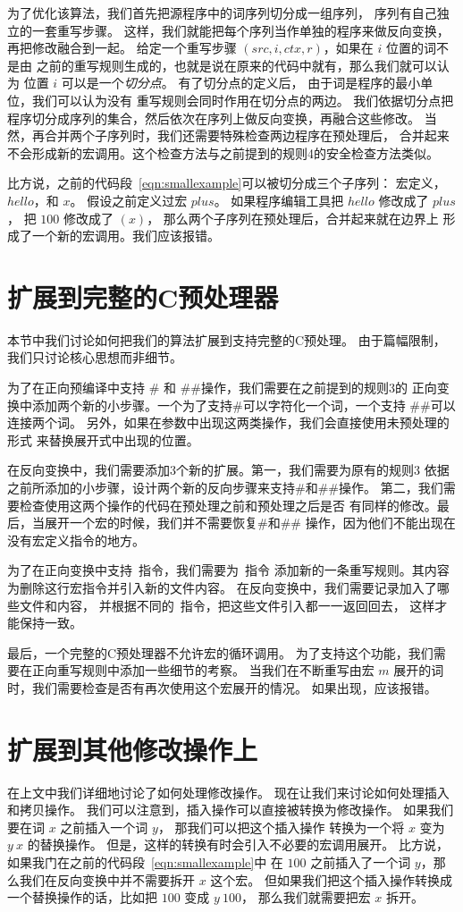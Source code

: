 为了优化该算法，我们首先把源程序中的词序列切分成一组序列，
序列有自己独立的一套重写步骤。
这样，我们就能把每个序列当作单独的程序来做反向变换，再把修改融合到一起。
给定一个重写步骤 $(src, i, ctx, r)$，如果在 $i$ 位置的词不是由
之前的重写规则生成的，也就是说在原来的代码中就有，那么我们就可以认为
位置 $i$ 可以是一个\emph{切分点}。
有了切分点的定义后， 由于词是程序的最小单位，我们可以认为没有
重写规则会同时作用在切分点的两边。
我们依据切分点把程序切分成序列的集合，然后依次在序列上做反向变换，再融合这些修改。
当然，再合并两个子序列时，我们还需要特殊检查两边程序在预处理后，
合并起来不会形成新的宏调用。这个检查方法与之前提到的规则4的安全检查方法类似。

比方说，之前的代码段~\ref{eqn:smallexample}可以被切分成三个子序列：
宏定义， $hello$，和 $x$。
假设之前定义过宏 $plus$。 如果程序编辑工具把 $hello$ 修改成了 $plus$，
把 $100$ 修改成了 $(x)$， 那么两个子序列在预处理后，合并起来就在边界上
形成了一个新的宏调用。我们应该报错。


\section{扩展到完整的C预处理器}\label{sec:fullC}
本节中我们讨论如何把我们的算法扩展到支持完整的C预处理。
由于篇幅限制，我们只讨论核心思想而非细节。

为了在正向预编译中支持 \# 和 \#\#操作，我们需要在之前提到的规则3的
正向变换中添加两个新的小步骤。一个为了支持\#可以字符化一个词，一个支持
\#\#可以连接两个词。
另外，如果在参数中出现这两类操作，我们会直接使用未预处理的形式
来替换展开式中出现的位置。

在反向变换中，我们需要添加3个新的扩展。第一，我们需要为原有的规则3
依据之前所添加的小步骤，设计两个新的反向步骤来支持\#和\#\#操作。
第二，我们需要检查使用这两个操作的代码在预处理之前和预处理之后是否
有同样的修改。最后，当展开一个宏的时候，我们并不需要恢复\#和\#\#
操作，因为他们不能出现在没有宏定义指令的地方。

为了在正向变换中支持~指令，我们需要为~指令
添加新的一条重写规则。其内容为删除这行宏指令并引入新的文件内容。
在反向变换中，我们需要记录加入了哪些文件和内容，
并根据不同的~指令，把这些文件引入都一一返回回去，
这样才能保持一致。

最后，一个完整的C预处理器不允许宏的循环调用。
为了支持这个功能，我们需要在正向重写规则中添加一些细节的考察。
当我们在不断重写由宏 $m$ 展开的词时，我们需要检查是否有再次使用这个宏展开的情况。
如果出现，应该报错。

\section{扩展到其他修改操作上}\label{sec:extend-other-changes}
在上文中我们详细地讨论了如何处理修改操作。
现在让我们来讨论如何处理插入和拷贝操作。
我们可以注意到，插入操作可以直接被转换为修改操作。
如果我们要在词 $x$ 之前插入一个词 $y$， 那我们可以把这个插入操作
转换为一个将 $x$ 变为  $y\ x$ 的替换操作。
但是，这样的转换有时会引入不必要的宏调用展开。
比方说，如果我门在之前的代码段~\ref{eqn:smallexample}中
在 $100$ 之前插入了一个词 $y$，那么我们在反向变换中并不需要拆开 $x$ 这个宏。
但如果我们把这个插入操作转换成一个替换操作的话，比如把 $100$ 变成 $y\ 100$，
那么我们就需要把宏 $x$ 拆开。

